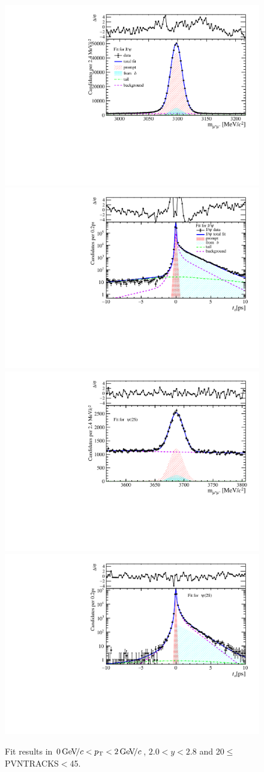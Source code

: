 \begin{figure}[H]
\begin{center}
\includegraphics[width=0.47\linewidth]{pdf/Jpsi/drawmass/n2y1pt1.pdf}
\includegraphics[width=0.47\linewidth]{pdf/Jpsi/2DFit/n2y1pt1.pdf}
\vspace*{-0.5cm}
\includegraphics[width=0.47\linewidth]{pdf/Psi2S/drawmass/n2y1pt1.pdf}
\includegraphics[width=0.47\linewidth]{pdf/Psi2S/2DFit/n2y1pt1.pdf}
\vspace*{-0.5cm}
\end{center}
\caption{Fit results in $0\text{\,Ge\kern -0.1em V\!/}c<p_{\mathrm{T}}<2\text{\,Ge\kern -0.1em V\!/}c$, $2.0<y<2.8$ and 20$\leq$PVNTRACKS$<$45.}
\label{Fitn2y1pt1}
\end{figure}

